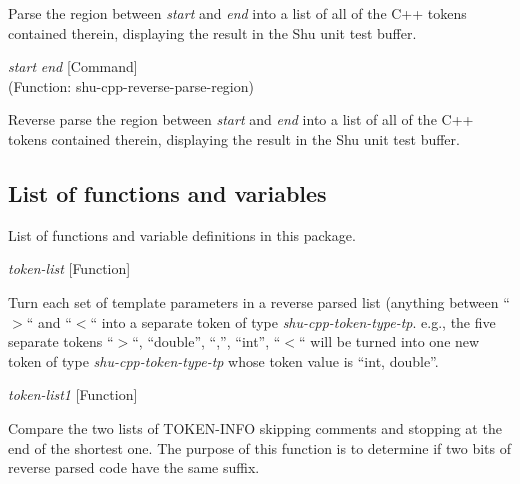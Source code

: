 \begin{doc-string}
Parse the region between \emph{start} and \emph{end} into a list of all of the C++ tokens
contained therein, displaying the result in the Shu unit test buffer.
\end{doc-string}

\vspace{1em}
\noindent
{}
\usebox{\funcname}\emph{start} \emph{end}
 \hfill [Command]\\%
 (Function: shu-cpp-reverse-parse-region)

\begin{doc-string}
Reverse parse the region between \emph{start} and \emph{end} into a list of all of the C++
tokens contained therein, displaying the result in the Shu unit test buffer.
\end{doc-string}

\subsection{List of functions and variables}

List of functions and variable definitions in this package.



\vspace{1em}
\noindent
{}
\usebox{\funcname}\emph{token-list}
 \hfill [Function]

\begin{doc-string}
Turn each set of template parameters in a reverse parsed list (anything between
``$>$`` and ``$<$`` into a separate token of type \emph{shu-cpp-token-type-tp}.  e.g., the
five separate tokens ``$>$``, ``double'', ``,'', ``int'', ``$<$`` will be turned into
one new token of type \emph{shu-cpp-token-type-tp} whose token value is ``int, double''.
\end{doc-string}

\vspace{1em}
\noindent
{}
\usebox{\funcname}\emph{token-list1}
 \hfill [Function]
\hspace*{\wd\funcname}

\begin{doc-string}
Compare the two lists of TOKEN-INFO skipping comments and stopping at the end
of the shortest one.  The purpose of this function is to determine if two bits
of reverse parsed code have the same suffix.
\end{doc-string}

